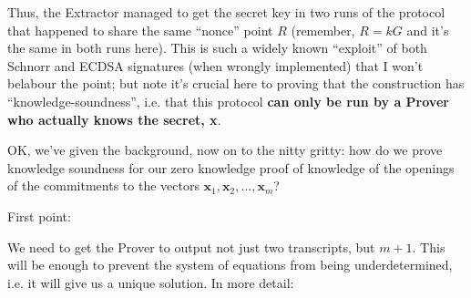 \documentclass[10pt,a4paper]{article}
\begin{document}
Thus, the Extractor managed to get the secret key in two runs of the
protocol that happened to share the same ``nonce'' point $R$ (remember, $R=kG$ and
it's the same in both runs here). This is such a widely known
``exploit'' of both Schnorr and ECDSA signatures (when wrongly
implemented) that I won't belabour the point; but note it's crucial here
to proving that the construction has ``knowledge-soundness'', i.e. that
this protocol \textbf{can only be run by a Prover who actually knows the
secret, x}.

OK, we've given the background, now on to the nitty gritty: how do we
prove knowledge soundness for our zero knowledge proof of knowledge of
the openings of the commitments to the vectors $\mathbf{x}_1, \mathbf{x}_2, \ldots, \mathbf{x}_m$?

First point:

We need to get the Prover to output not just two transcripts, but $m+1$. This
will be enough to prevent the system of equations from being
underdetermined, i.e. it will give us a unique solution. In more detail:
\end{document}
